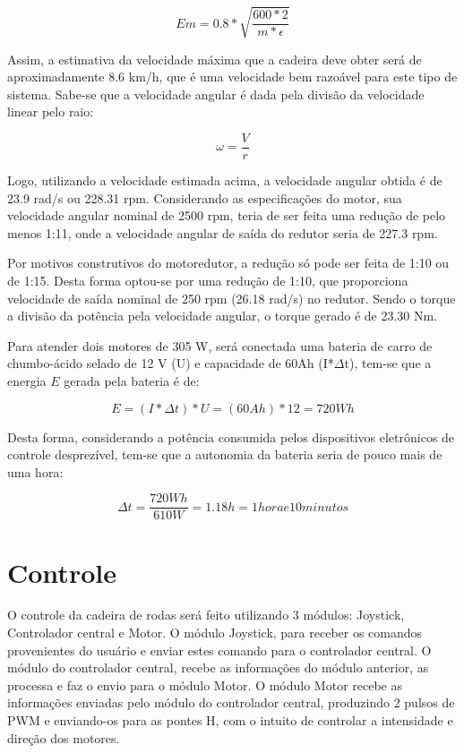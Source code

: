   \begin{equation}
  Em = 0.8*\sqrt{\frac{600*2}{m*\epsilon}}
  \end{equation}

  Assim, a estimativa da velocidade máxima que a cadeira deve obter será de aproximadamente 8.6 km/h, que é uma velocidade bem razoável para este tipo de sistema. Sabe-se que a velocidade angular é dada pela divisão da velocidade linear pelo raio:

  \begin{equation}
  \omega = \frac{V}{r}
  \end{equation}

  Logo, utilizando a velocidade estimada acima, a velocidade angular obtida é de 23.9 rad/s ou 228.31 rpm. Considerando as especificações do motor, sua velocidade angular nominal de 2500 rpm, teria de ser feita uma redução de pelo menos 1:11, onde a velocidade angular de saída do redutor seria de 227.3 rpm.

  Por motivos construtivos do motoredutor, a redução só pode ser feita de 1:10 ou de 1:15. Desta forma optou-se por uma redução de 1:10, que proporciona velocidade de saída nominal de 250 rpm (26.18 rad/s) no redutor. Sendo o torque a divisão da potência pela velocidade angular, o torque gerado é de 23.30 Nm.

  Para atender dois motores de 305 W, será conectada uma bateria de carro de chumbo-ácido selado de 12 V (U) e capacidade de 60Ah (I*$\Delta$t), tem-se que a energia $E$ gerada pela bateria é de:

  \begin{equation}
  E = (I*\Delta t)*U = (60Ah)*12 = 720Wh
  \end{equation}

  Desta forma, considerando a potência consumida pelos dispositivos eletrônicos de controle desprezível, tem-se que a autonomia da bateria seria de pouco mais de uma hora:

  \begin{equation}
  \Delta t = \frac{720 Wh}{610 W} = 1.18 h = 1 hora e 10 minutos
  \end{equation}

\section{Controle}

  O controle da cadeira de rodas será feito utilizando 3 módulos: Joystick, Controlador central e Motor.
  O módulo Joystick, para receber os comandos provenientes do usuário e enviar estes comando para o controlador central. O módulo do controlador central, recebe as informações do módulo anterior, as processa e faz o envio para o módulo Motor. O módulo Motor recebe as informações enviadas pelo módulo do controlador central, produzindo 2 pulsos de PWM e enviando-os para as pontes H, com o intuito de controlar a intensidade e direção dos motores.

